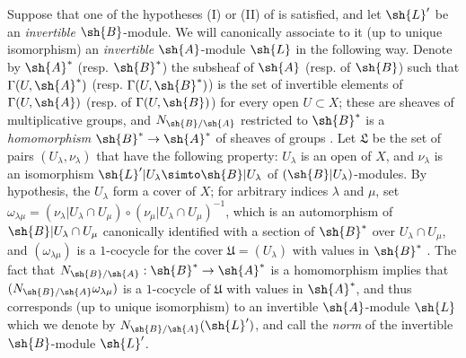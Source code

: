 \begin{env}[6.5.2]
\label{II.6.5.2}
Suppose that one of the hypotheses (I) or (II) of  is satisfied, and let $\sh{L}'$ be an \emph{invertible} $\sh{B}$-module.
We will canonically associate to it (up to unique isomorphism) an \emph{invertible} $\sh{A}$-module $\sh{L}$ in the following way.
Denote by $\sh{A}^*$ (resp. $\sh{B}^*$) the subsheaf of $\sh{A}$ (resp. of $\sh{B}$) such that $\Gamma(U,\sh{A}^*)$ (resp. $\Gamma(U,\sh{B}^*)$) is the set of invertible elements of $\Gamma(U,\sh{A})$ (resp. of $\Gamma(U,\sh{B})$) for every open $U\subset X$;
these are sheaves of multiplicative groups, and $N_{\sh{B}/\sh{A}}$ restricted to $\sh{B}^*$ is a \emph{homomorphism} $\sh{B}^*\to\sh{A}^*$ of sheaves of groups .
Let $\mathfrak{L}$ be the set of pairs $(U_\lambda,\nu_\lambda)$ that have the following property: $U_\lambda$ is an open of $X$, and $\nu_\lambda$ is an isomorphism $\sh{L}'|U_\lambda\simto\sh{B}|U_\lambda$ of $(\sh{B}|U_\lambda)$-modules.
By hypothesis, the $U_\lambda$ form a cover of $X$;
for arbitrary indices $\lambda$ and $\mu$, set $\omega_{\lambda\mu}=(\nu_\lambda|U_\lambda\cap U_\mu)\circ(\nu_\mu|U_\lambda\cap U_\mu)^{-1}$, which is an automorphism of $\sh{B}|U_\lambda\cap U_\mu$ canonically identified with a section of $\sh{B}^*$ over $U_\lambda\cap U_\mu$, and $(\omega_{\lambda\mu})$ is a $1$-cocycle for the cover $\mathfrak{U}=(U_\lambda)$ with values in $\sh{B}^*$ .
The fact that $N_{\sh{B}/\sh{A}}:\sh{B}^*\to\sh{A}^*$ is a homomorphism implies that $(N_{\sh{B}/\sh{A}}\omega_{\lambda\mu})$ is a $1$-cocycle of $\mathfrak{U}$ with values in $\sh{A}^*$, and thus corresponds (up to unique isomorphism) to an invertible $\sh{A}$-module $\sh{L}$  which we denote by $N_{\sh{B}/\sh{A}}(\sh{L}')$, and call the \emph{norm} of the invertible $\sh{B}$-module $\sh{L}'$.


\end{env}
